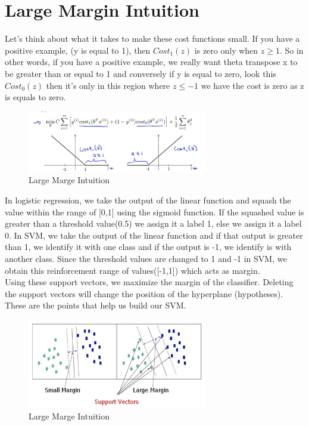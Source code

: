 \section{Large Margin Intuition}

Let's think about what it takes to make these cost functions small. If you have a positive example, (y is equal to 1), then $ Cost_1(z) $ is zero only when $ z \geq 1 $. So in other words, if you have a positive example, we really want theta transpose x to be greater than or equal to 1 and conversely if y is equal to zero, look this $ Cost_0(z) $ then it's only in this region where $ z \leq -1 $ we have the cost is zero as z is equals to zero.

\begin{figure}[h!]
	\centering
	\includegraphics[width=0.7\textwidth]{fig/LMI_SVM_0}
	\caption{Large Marge Intuition}
	\label{fig:lmisvm0}
\end{figure}

In logistic regression, we take the output of the linear function and squash the value within the range of [0,1] using the sigmoid function. If the squashed value is greater than a threshold value(0.5) we assign it a label 1, else we assign it a label 0. In SVM, we take the output of the linear function and if that output is greater than 1, we identify it with one class and if the output is -1, we identify is with another class. Since the threshold values are changed to 1 and -1 in SVM, we obtain this reinforcement range of values([-1,1]) which acts as margin.\\

Using these support vectors, we maximize the margin of the classifier. Deleting the support vectors will change the position of the hyperplane (hypotheses). These are the points that help us build our SVM.

\begin{figure}[h!]
	\centering
	\includegraphics[width=0.7\textwidth]{fig/LMI_SVM}
	\caption{Large Marge Intuition}
	\label{fig:lmisvm}
\end{figure}
